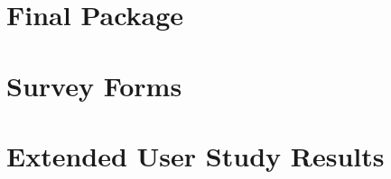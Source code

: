 \documentclass[12pt,twoside]{report}
\begin{document}
\printbibliography

\appendix
\chapter{Final Package}
\label{app:final-package}

\chapter{Survey Forms}
\label{app:survey}

\chapter{Extended User Study Results}
\label{app:results}

\end{document}
